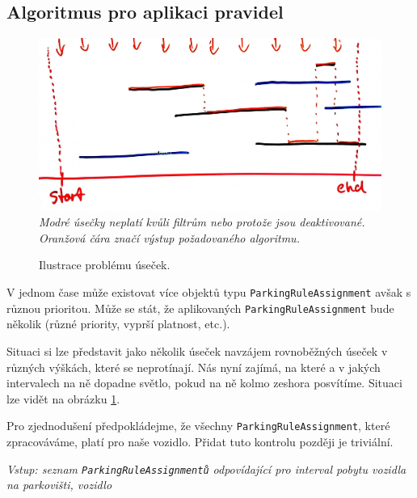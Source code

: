 \subsection{Algoritmus pro aplikaci pravidel}

\begin{figure}[!htb] \centering
  \includegraphics[width=145mm]{../img/rules_drawing.jpg}
  \textit{Modré úsečky neplatí kvůli filtrům nebo protože jsou deaktivované. Oranžová čára značí výstup požadovaného algoritmu.}
  \caption{Ilustrace problému úseček.}
  \label{fig:rules_drawing}
\end{figure}

V jednom čase může existovat více objektů typu \texttt{ParkingRuleAssignment} avšak s různou prioritou.
Může se stát, že aplikovaných \texttt{ParkingRuleAssignment} bude několik (různé priority, vyprší platnost, etc.).

Situaci si lze představit jako několik úseček navzájem rovnoběžných úseček v různých výškách, které se neprotínají.
Nás nyní zajímá, na které a v jakých intervalech na ně dopadne světlo, pokud na ně kolmo zeshora posvítíme.
Situaci lze vidět na obrázku \ref{fig:rules_drawing}.

Pro zjednodušení předpokládejme, že všechny \texttt{ParkingRuleAssignment}, které zpracováváme, platí pro naše vozidlo.
Přidat tuto kontrolu později je triviální.

\textit{Vstup: seznam \texttt{ParkingRuleAssignmentů} odpovídající pro interval pobytu vozidla na parkovišti, vozidlo}

